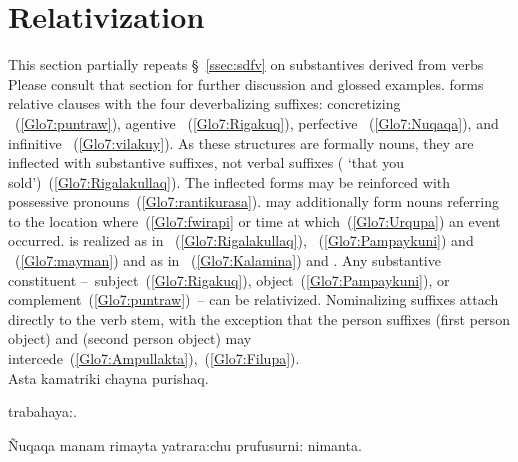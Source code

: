 \section{Relativization}
This section partially repeats §~\ref{ssec:sdfv} on substantives derived from verbs Please consult that section for further discussion and glossed examples. \SYQ{} forms relative clauses with the four deverbalizing suffixes: concretizing ~(\ref{Glo7:puntraw}), agentive ~(\ref{Glo7:Rigakuq}), perfective ~(\ref{Glo7:Nuqaqa}), and infinitive ~(\ref{Glo7:vilakuy}). As these structures are formally nouns, they are inflected with substantive suffixes, not verbal suffixes (  ‘that you sold’)~(\ref{Glo7:Rigalakullaq}). The inflected forms may be reinforced with possessive pronouns~(\ref{Glo7:rantikurasa}).  may additionally form nouns referring to the location where~(\ref{Glo7:fwirapi} or time at which~(\ref{Glo7:Urqupa}) an event  occurred.  is realized as  in \ACH{}~(\ref{Glo7:Rigalakullaq}), \AMV{}~(\ref{Glo7:Pampaykuni}) and \SP{}~(\ref{Glo7:mayman}) and as  in \LT{}~(\ref{Glo7:Kalamina}) and \CH. Any substantive constituent --~subject~(\ref{Glo7:Rigakuq}), object~(\ref{Glo7:Pampaykuni}), or complement~(\ref{Glo7:puntraw})~-- can be relativized. Nominalizing suffixes attach directly to the verb stem, with the exception that the person suffixes  (first person object) and  (second person object) may intercede~(\ref{Glo7:Ampullakta}),~(\ref{Glo7:Filupa}).\\

%
{Asta kamatriki chayna purishaq.}%
{}%
{}{}%

%
{ trabahaya:.}%
{}%
{}{}%

%
{Ñuqaqa manam rimayta yatrara:chu prufusurni: nimanta.}%
{}%
{}{}%


